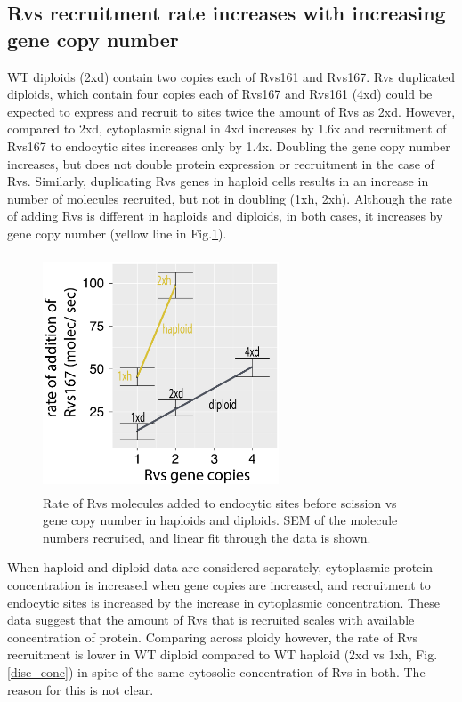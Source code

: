 \subsection{Rvs recruitment rate increases with increasing gene copy number}
 WT diploids (2xd) contain two copies each of Rvs161 and Rvs167. Rvs duplicated diploids, which contain four copies each of Rvs167 and Rvs161 (4xd) could be expected to express and recruit to sites twice the amount of Rvs as 2xd. However, compared to 2xd, cytoplasmic signal in 4xd increases by 1.6x and recruitment of Rvs167 to endocytic sites increases only by 1.4x. Doubling the gene copy number increases, but does not double protein expression or recruitment in the case of Rvs. Similarly, duplicating Rvs genes in haploid cells results in an increase in number of molecules recruited, but not in doubling (1xh, 2xh). Although the rate of adding Rvs is different in haploids and diploids, in both cases, it increases by gene copy number (yellow line in Fig.\ref{disc_recruit_rate}). 

	\begin{figure}[H]
	\centering
	\hspace{-1cm}
	\includegraphics[width=7cm,height=7cm,keepaspectratio]{figures/discussion/recruit_rate_final}
	\caption[Rate of recruitment of Rvs]
{Rate of Rvs molecules added to endocytic sites before scission vs gene copy number in haploids and diploids. SEM of the molecule numbers recruited, and linear fit through the data is shown.
	\label{disc_recruit_rate}}
\end{figure}

	\vspace{5mm}
When haploid and diploid data are considered separately, cytoplasmic protein concentration is increased when gene copies are increased, and recruitment to endocytic sites is increased by the increase in cytoplasmic concentration. These data suggest that the amount of Rvs that is recruited scales with available concentration of protein. Comparing across ploidy however, the rate of Rvs recruitment is lower in WT diploid compared to WT haploid (2xd vs 1xh, Fig.\ref{disc_conc}) in spite of the same cytosolic concentration of Rvs in both. The reason for this is not clear. 


